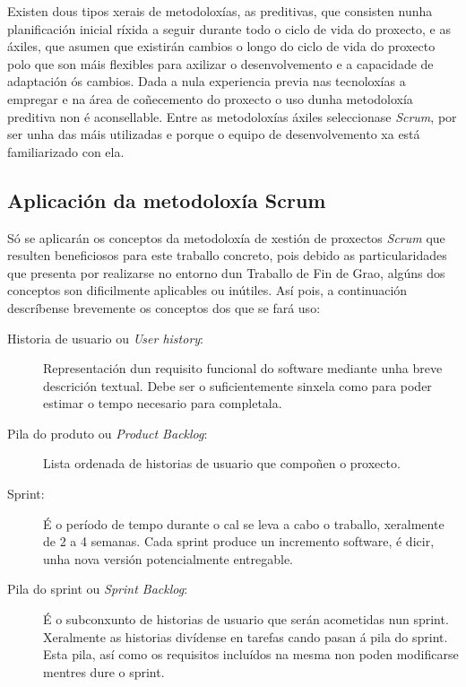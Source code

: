 Existen dous tipos xerais de metodoloxías, as preditivas, que consisten nunha planificación inicial ríxida a seguir durante todo o ciclo de vida do proxecto, e as áxiles, que asumen que existirán cambios o longo do ciclo de vida do proxecto polo que son máis flexibles para axilizar o desenvolvemento e a capacidade de adaptación ós cambios. Dada a nula experiencia previa nas tecnoloxías a empregar e  na área de coñecemento do proxecto o uso dunha metodoloxía preditiva non é aconsellable. Entre as metodoloxías áxiles seleccionase \emph{Scrum}\cite{ScrumManager}, por ser unha das máis utilizadas e porque o equipo de desenvolvemento xa está familiarizado con ela.

\subsection{Aplicación da metodoloxía Scrum}

Só se aplicarán os conceptos da metodoloxía de xestión de proxectos \emph{Scrum} que resulten beneficiosos para este traballo concreto, pois debido as particularidades que presenta por realizarse no entorno dun Traballo de Fin de Grao, algúns dos conceptos son dificilmente aplicables ou inútiles. Así pois, a continuación descríbense brevemente os conceptos dos que se fará uso:
\begin{description}
\item[Historia de usuario ou \emph{User history}:] Representación dun requisito funcional do software mediante unha breve descrición textual. Debe ser o suficientemente sinxela como para poder estimar o tempo necesario para completala.
\item[Pila do produto ou \emph{Product Backlog}:] Lista ordenada de historias de usuario que compoñen o proxecto.
\item[Sprint:] É o período de tempo durante o cal se leva a cabo o traballo, xeralmente de 2 a 4 semanas. Cada sprint produce un incremento software, é dicir, unha nova versión potencialmente entregable.
\item[Pila do sprint ou \emph{Sprint Backlog}:] É o subconxunto de historias de usuario que serán acometidas nun sprint. Xeralmente as historias divídense en tarefas cando pasan á pila do sprint. Esta pila, así como os requisitos incluídos na mesma non poden modificarse mentres dure o sprint.
\end{description}

